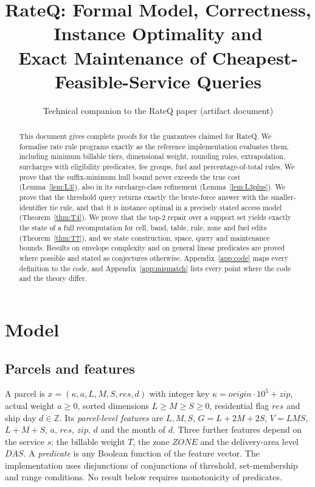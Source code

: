 \documentclass[11pt]{article}
\title{RateQ: Formal Model, Correctness, Instance Optimality and\\ Exact Maintenance of Cheapest-Feasible-Service Queries}
\author{Technical companion to the RateQ paper (artifact document)}
\date{}
\theoremstyle{definition}
\theoremstyle{remark}
\begin{document}
\maketitle

\begin{abstract}
This document gives complete proofs for the guarantees claimed for RateQ. We
formalise rate rule programs exactly as the reference implementation evaluates them,
including minimum billable tiers, dimensional weight, rounding rules, extrapolation,
surcharges with eligibility predicates, fee groups, fuel and percentage-of-total rules.
We prove that the suffix-minimum hull bound never exceeds the true cost (Lemma~\ref{lem:L3}),
also in its surcharge-class refinement (Lemma~\ref{lem:L3plus}). We prove that the threshold
query returns exactly the brute-force answer with the smaller-identifier tie rule, and
that it is instance optimal in a precisely stated access model (Theorem~\ref{thm:T4}). We
prove that the top-2 repair over a support set yields exactly the state of a full
recomputation for cell, band, table, rule, zone and fuel edits (Theorem~\ref{thm:T7}), and we
state construction, space, query and maintenance bounds. Results on envelope complexity
and on general linear predicates are proved where possible and stated as conjectures
otherwise. Appendix~\ref{app:code} maps every definition to the code, and
Appendix~\ref{app:mismatch} lists every point where the code and the theory differ.
\end{abstract}

\section{Model}\label{sec:model}

\subsection{Parcels and features}
A parcel is $x=(\kappa,a,L,M,S,\mathit{res},d)$ with integer key
$\kappa=\mathit{origin}\cdot 10^5+\mathit{zip}$, actual weight $a\ge 0$, sorted dimensions
$L\ge M\ge S\ge 0$, residential flag $\mathit{res}$ and ship day $d\in\mathbb Z$. Its
\emph{parcel-level features} are $L,M,S$, $G=L+2M+2S$, $V=LMS$, $L+M+S$, $a$,
$\mathit{res}$, $\mathit{zip}$, $d$ and the month of $d$. Three further features depend on
the service $s$: the billable weight $T$, the zone $\mathit{ZONE}$ and the delivery-area
level $\mathit{DAS}$. A \emph{predicate} is any Boolean function of the feature vector. The
implementation uses disjunctions of conjunctions of threshold, set-membership and range
conditions. No result below requires monotonicity of predicates.
\end{document}
